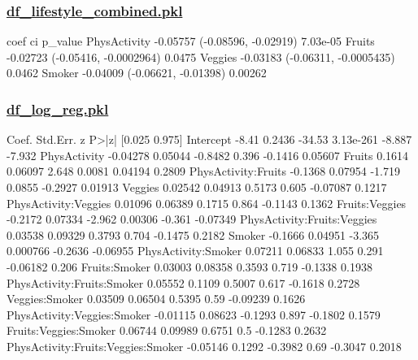 \documentclass[11pt]{article}
\begin{document}
\subsubsection*{\hyperlink{code-df-lifestyle-combined-pkl}{df\_lifestyle\_combined.pkl}}

\begin{codeoutput}
                 coef                      ci   p_value
PhysActivity -0.05757    (-0.08596, -0.02919)  7.03e-05
Fruits       -0.02723  (-0.05416, -0.0002964)    0.0475
Veggies      -0.03183  (-0.06311, -0.0005435)    0.0462
Smoker       -0.04009    (-0.06621, -0.01398)   0.00262
\end{codeoutput}
\hypertarget{file-df-log-reg-pkl}{}

\subsubsection*{\hyperlink{code-df-log-reg-pkl}{df\_log\_reg.pkl}}

\begin{codeoutput}
                                      Coef. Std.Err.       z      P>|z|   [0.025   0.975]
Intercept                             -8.41   0.2436  -34.53  3.13e-261   -8.887   -7.932
PhysActivity                       -0.04278  0.05044 -0.8482      0.396  -0.1416  0.05607
Fruits                               0.1614  0.06097   2.648     0.0081  0.04194   0.2809
PhysActivity:Fruits                 -0.1368  0.07954  -1.719     0.0855  -0.2927  0.01913
Veggies                             0.02542  0.04913  0.5173      0.605 -0.07087   0.1217
PhysActivity:Veggies                0.01096  0.06389  0.1715      0.864  -0.1143   0.1362
Fruits:Veggies                      -0.2172  0.07334  -2.962    0.00306   -0.361 -0.07349
PhysActivity:Fruits:Veggies         0.03538  0.09329  0.3793      0.704  -0.1475   0.2182
Smoker                              -0.1666  0.04951  -3.365   0.000766  -0.2636 -0.06955
PhysActivity:Smoker                 0.07211  0.06833   1.055      0.291 -0.06182    0.206
Fruits:Smoker                       0.03003  0.08358  0.3593      0.719  -0.1338   0.1938
PhysActivity:Fruits:Smoker          0.05552   0.1109  0.5007      0.617  -0.1618   0.2728
Veggies:Smoker                      0.03509  0.06504  0.5395       0.59 -0.09239   0.1626
PhysActivity:Veggies:Smoker        -0.01115  0.08623 -0.1293      0.897  -0.1802   0.1579
Fruits:Veggies:Smoker               0.06744  0.09989  0.6751        0.5  -0.1283   0.2632
PhysActivity:Fruits:Veggies:Smoker -0.05146   0.1292 -0.3982       0.69  -0.3047   0.2018
\end{codeoutput}
\hypertarget{file-additional-results-pkl}{}
\end{document}

